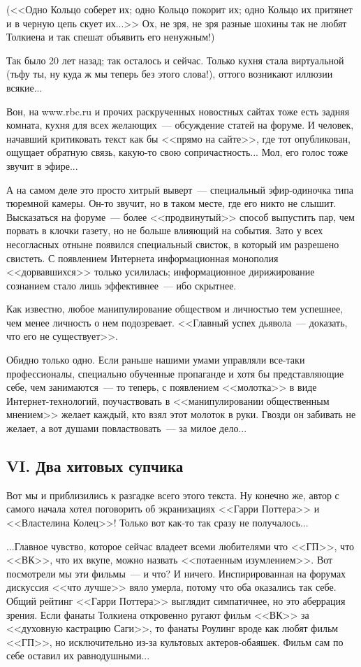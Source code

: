 \documentclass{scrbook}
\newcommand{\flqq}{<<}
\newcommand{\frqq}{>>}
\newcommand{\mdash}{~--- }
\newcommand{\essaysection}[1]{\subsection*{#1}\nopagebreak}
\begin{document}
({\flqq}Одно Кольцо соберет их; одно Кольцо покорит их; одно Кольцо их притянет и в черную цепь скует их...{\frqq} Ох, не зря, не зря разные шохины так не любят Толкиена и так спешат объявить его ненужным!)

Так было 20 лет назад; так осталось и сейчас. Только кухня стала виртуальной (тьфу ты, ну куда ж мы теперь без этого слова!), оттого возникают иллюзии всякие...

Вон, на www.rbc.ru и прочих раскрученных новостных сайтах тоже есть задняя комната, кухня для всех желающих{\mdash}обсуждение статей на форуме. И человек, начавший критиковать текст как бы {\flqq}прямо на сайте{\frqq}, где тот опубликован, ощущает обратную связь, какую-то свою сопричастность... Мол, его голос тоже звучит в эфире...

А на самом деле это просто хитрый выверт{\mdash}специальный эфир-одиночка типа тюремной камеры. Он-то звучит, но в таком месте, где его никто не слышит. Высказаться на форуме{\mdash}более {\flqq}продвинутый{\frqq} способ выпустить пар, чем порвать в клочки газету, но не больше влияющий на события. Зато у всех несогласных отныне появился специальный свисток, в который им разрешено свистеть. С появлением Интернета информационная монополия {\flqq}дорвавшихся{\frqq} только усилилась; информационное дирижирование сознанием стало лишь эффективнее{\mdash}ибо скрытнее.

Как известно, любое манипулирование обществом и личностью тем успешнее, чем менее личность о нем подозревает. {\flqq}Главный успех дьявола{\mdash}доказать, что его не существует{\frqq}.

Обидно только одно. Если раньше нашими умами управляли все-таки профессионалы, специально обученные пропаганде и хотя бы представляющие себе, чем занимаются{\mdash}то теперь, с появлением {\flqq}молотка{\frqq} в виде Интернет-технологий, поучаствовать в {\flqq}манипулировании общественным мнением{\frqq} желает каждый, кто взял этот молоток в руки. Гвозди он забивать не желает, а вот душами повластвовать{\mdash}за милое дело...

\essaysection{VI. Два хитовых супчика}

Вот мы и приблизились к разгадке всего этого текста. Ну конечно же, автор с самого начала хотел поговорить об экранизациях {\flqq}Гарри Поттера{\frqq} и {\flqq}Властелина Колец{\frqq}! Только вот как-то так сразу не получалось...

...Главное чувство, которое сейчас владеет всеми любителями что {\flqq}ГП{\frqq}, что {\flqq}ВК{\frqq}, что их вкупе, можно назвать {\flqq}потаенным изумлением{\frqq}. Вот посмотрели мы эти фильмы{\mdash}и что? И ничего. Инспирированная на форумах дискуссия {\flqq}что лучше{\frqq} вяло умерла, потому что оба оказались так себе. Общий рейтинг {\flqq}Гарри Поттера{\frqq} выглядит симпатичнее, но это аберрация зрения. Если фанаты Толкиена откровенно ругают фильм {\flqq}ВК{\frqq} за {\flqq}духовную кастрацию Саги{\frqq}, то фанаты Роулинг вроде как любят фильм {\flqq}ГП{\frqq}, но исключительно из-за культовых актеров-обаяшек. Фильм сам по себе оставил их равнодушными...
\end{document}
